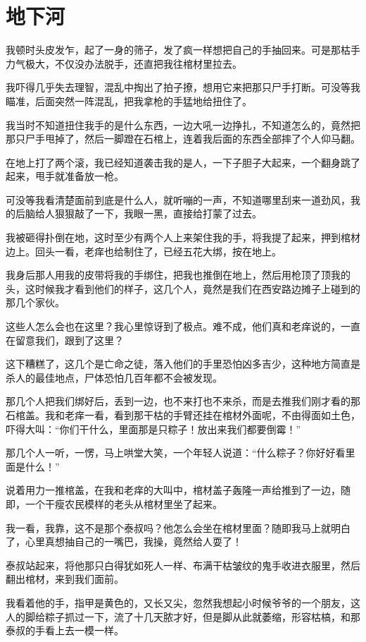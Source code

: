 \chapter{地下河}

我顿时头皮发乍，起了一身的筛子，发了疯一样想把自己的手抽回来。可是那枯手力气极大，不仅没办法脱手，还直把我往棺材里拉去。

我吓得几乎失去理智，混乱中掏出了拍子撩，想用它来把那只尸手打断。可没等我瞄准，后面突然一阵混乱，把我拿枪的手猛地给扭住了。

我当时不知道扭住我手的是什么东西，一边大吼一边挣扎，不知道怎么的，竟然把那只尸手甩掉了，然后一脚蹬在石棺上，连着我后面的东西全部摔了个人仰马翻。

在地上打了两个滚，我已经知道袭击我的是人，一下子胆子大起来，一个翻身跳了起来，甩手就准备放一枪。

可没等我看清楚面前到底是什么人，就听嘣的一声，不知道哪里刮来一道劲风，我的后脑给人狠狠敲了一下，我眼一黑，直接给打蒙了过去。

我被砸得扑倒在地，这时至少有两个人上来架住我的手，将我提了起来，押到棺材边上。回头一看，老痒也给制住了，已经五花大绑，按在地上。

我身后那人用我的皮带将我的手绑住，把我也推倒在地上，然后用枪顶了顶我的头，这时候我才看到他们的样子，这几个人，竟然是我们在西安路边摊子上碰到的那几个家伙。

这些人怎么会也在这里？我心里惊讶到了极点。难不成，他们真和老痒说的，一直在留意我们，跟到了这里？

这下糟糕了，这几个是亡命之徒，落入他们的手里恐怕凶多吉少，这种地方简直是杀人的最佳地点，尸体恐怕几百年都不会被发现。

那几个人把我们绑好后，丢到一边，也不来打也不来杀，而是去推我们刚才看的那石棺盖。我和老痒一看，看到那干枯的手臂还挂在棺材外面呢，不由得面如土色，吓得大叫：“你们干什么，里面那是只粽子！放出来我们都要倒霉！”

那几个人一听，一愣，马上哄堂大笑，一个年轻人说道：“什么粽子？你好好看里面是什么！”

说着用力一推棺盖，在我和老痒的大叫中，棺材盖子轰隆一声给推到了一边，随即，一个干瘦农民模样的老头从棺材里坐了起来。

我一看，我靠，这不是那个泰叔吗？他怎么会坐在棺材里面？随即我马上就明白了，心里真想抽自己的一嘴巴，我操，竟然给人耍了！

泰叔站起来，将他那只白得犹如死人一样、布满干枯皱纹的鬼手收进衣服里，然后翻出棺材，来到我们面前。

我看着他的手，指甲是黄色的，又长又尖，忽然我想起小时候爷爷的一个朋友，这人的脚给粽子抓过一下，流了十几天脓才好，但是脚从此就萎缩，形容枯槁，和那泰叔的手看上去一模一样。

